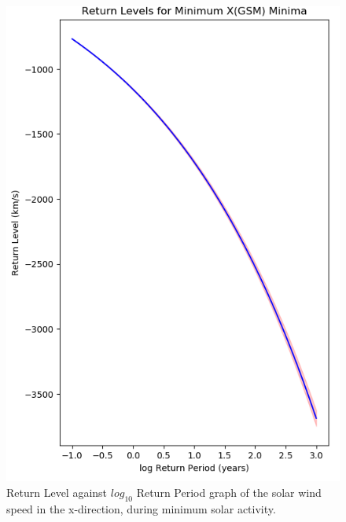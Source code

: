 \documentclass[11pt]{article}
\begin{document}
\begin{figure}[t!]
\begin{minipage}{0.48\textwidth}
                \includegraphics[width=\textwidth]{fig_method/SWEminXminReturn.png}
                \caption{Return Level against $log_{10}$ Return Period graph of the solar wind speed in the x-direction, during minimum solar activity.}
                \label{fig:SWEminXminReturn}
            \end{minipage}
        \end{figure}
\end{document}
